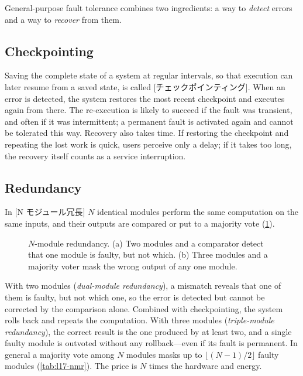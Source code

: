 \documentclass[../main.tex]{subfiles}
\begin{document}
General-purpose fault tolerance combines two ingredients: a way to
\emph{detect} errors and a way to \emph{recover} from them.

\subsection{Checkpointing}

Saving the complete state of a system at regular intervals, so that
execution can later resume from a saved state, is called
[チェックポインティング].  When an error is detected,
the system restores the most recent checkpoint and executes again from
there.  The re-execution is likely
to succeed if the fault was transient,
and often if it was intermittent; a permanent fault is activated again and
cannot be tolerated this way.  Recovery also takes time.  If restoring the
checkpoint and repeating the lost work is quick, users perceive only a delay;
if it takes too long, the recovery itself counts as a service interruption.

\subsection{Redundancy}

\begin{definition}
  In [N モジュール冗長]
  $N$ identical modules perform the same computation on the same inputs, and
  their outputs are compared or put to a majority vote
  (\cref{fig:l17-nmr}).
\end{definition}

\begin{figure}[htbp]
  \centering
  
  \caption{$N$-module redundancy.  (a) Two modules and a comparator detect
    that one module is faulty, but not which.  (b) Three modules and a
    majority voter mask the wrong output of any one module.}
  \label{fig:l17-nmr}
\end{figure}

With two modules (\emph{dual-module redundancy}), a mismatch reveals that
one of them is faulty, but not which one, so the error is detected but
cannot be corrected by the comparison alone.  Combined with checkpointing,
the system rolls back and repeats the computation.  With three modules
(\emph{triple-module redundancy}), the correct result is the one produced by
at least two, and a single faulty module is outvoted without any
rollback---even if its fault is permanent.  In general a majority vote among
$N$ modules masks up to $\lfloor (N-1)/2 \rfloor$ faulty modules
(\cref{tab:l17-nmr}).  The price is $N$ times the hardware and
energy.
\end{document}
